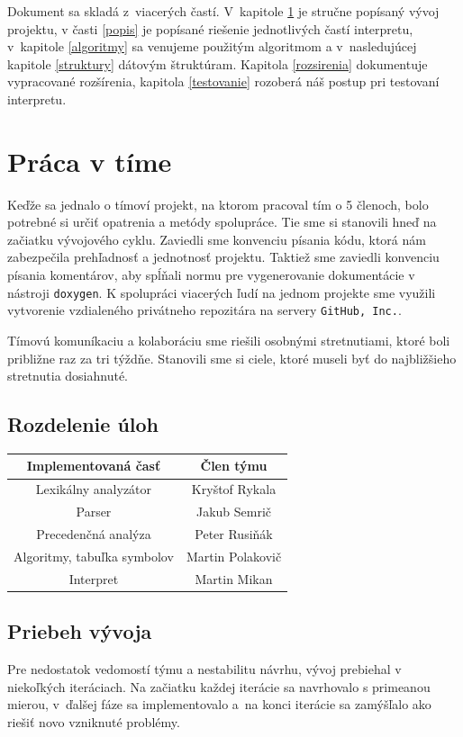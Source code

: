 \documentclass[11pt,a4paper]{article}
\begin{document}
Dokument sa skladá z~viacerých častí. V~kapitole \ref{tim} je stručne popísaný vývoj projektu, v časti \ref{popis} je popísané riešenie jednotlivých častí interpretu, v~kapitole \ref{algoritmy} sa venujeme použitým algoritmom a v~nasledujúcej kapitole \ref{struktury} dátovým štruktúram. Kapitola \ref{rozsirenia} dokumentuje vypracované rozšírenia, kapitola \ref{testovanie} rozoberá náš postup pri testovaní interpretu.


\section{Práca v tíme}
\label{tim}

Keďže sa jednalo o tímoví projekt, na ktorom pracoval tím o 5 členoch, bolo potrebné si určiť opatrenia a metódy spolupráce. Tie sme si stanovili hneď na začiatku vývojového cyklu. Zaviedli sme konvenciu písania kódu, ktorá nám zabezpečila prehľadnosť a jednotnosť projektu. Taktiež sme zaviedli konvenciu písania komentárov, aby spĺňali normu pre vygenerovanie dokumentácie v nástroji \texttt{doxygen}. K spolupráci viacerých ľudí na jednom projekte sme využili vytvorenie vzdialeného privátneho repozitára na servery \texttt{GitHub, Inc.}.

Tímovú komuníkaciu a kolaboráciu sme riešili osobnými stretnutiami, ktoré boli približne raz za tri týždňe. Stanovili sme si ciele, ktoré museli byť do najbližšieho stretnutia dosiahnuté.

    \subsection{Rozdelenie úloh}
    \begin{center}
    \begin{tabular}{|c|c|}
    \hline
    \large{\textbf{Implementovaná časť}} & \large{\textbf{Člen týmu}}\\
    \hline
    \hline
    Lexikálny analyzátor & Kryštof Rykala \\
    \hline
    Parser & Jakub Semrič \\
    \hline
    Precedenčná analýza & Peter Rusiňák \\
    \hline
    Algoritmy, tabuľka symbolov & Martin Polakovič \\
    \hline
    Interpret & Martin Mikan \\
    \hline
    \end{tabular}
\end{center}

    \subsection{Priebeh vývoja}
    \label{vyvoj}
    Pre nedostatok vedomostí týmu a nestabilitu návrhu, vývoj prebiehal v niekoľkých
    iteráciach. Na začiatku každej iterácie sa navrhovalo s primeanou mierou,
    v~ďalšej fáze sa implementovalo a~na konci iterácie sa zamýšľalo ako riešiť
    novo vzniknuté problémy.
\end{document}
